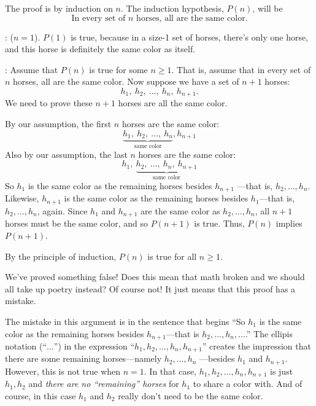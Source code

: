 \begin{bogusproof}

The proof is by induction on $n$.  The induction hypothesis, $P(n)$,
will be
\begin{equation}\label{horsehyp}
\text{In every set of $n$ horses, all are the same color.}
\end{equation}

: ($n=1$).  $P(1)$ is true, because in a
size-1 set of horses, there's only one horse, and this horse is
definitely the same color as itself.

: Assume that $P(n)$ is true for some $n \geq 1$.
That is, assume that in every set of $n$ horses, all are the same color.
Now suppose we have a set of $n+1$ horses:
\[
h_1,\ h_2,\ \dots,\ h_n,\ h_{n+1}.
\]
We need to prove these $n+1$ horses are all the same color.

By our assumption, the first $n$ horses are the same color:
\[
\underbrace{h_1,\ h_2,\ \dots,\ h_n}_{\text{same color}}, h_{n+1}
\]
Also by our assumption, the last $n$ horses are the same color:
\[
h_1,\ \underbrace{h_2,\ \dots,\ h_n,\ h_{n+1}}_{\text{same color}}
\]
So $h_1$ is the same color as the remaining horses besides $h_{n+1}$
---that is, $h_2, \dots, h_n$.  Likewise, $h_{n+1}$ is the same
color as the remaining horses besides $h_1$---that is, $h_2, \dots,
h_n$, again.  Since $h_1$ and $h_{n+1}$ are the same color as $h_2,
\dots, h_n$, all $n+1$ horses must be the same color, and so $P(n+1)$
is true.  Thus, $P(n)$ implies $P(n+1)$.

By the principle of induction, $P(n)$ is true for all $n \geq 1$.
\end{bogusproof}
We've proved something false!  Does this mean that math broken and we
should all take up poetry instead?  Of course not!  It just means
that this proof has a mistake.

\iffalse

\textbf{See if you can figure it out before we take it up in class.}
\fi



The mistake in this argument is in the sentence that begins ``So $h_1$
is the same color as the remaining horses besides $h_{n+1}$---that is
$h_2, \dots, h_n, \dots$.''  The ellipis notation (``$\dots$'') in the
expression ``$h_1, h_2, \dots, h_n, h_{n+1}$'' creates the impression
that there are some remaining horses---namely $h_2, \dots, h_n$
---besides $h_1$ and $h_{n+1}$.  However, this is not true when $n =
1$.  In that case, $h_1, h_2, \dots, h_n, h_{n+1}$ is just $h_1, h_2$
and \emph{there are no ``remaining'' horses} for $h_1$ to share a
color with.  And of course, in this case $h_1$ and $h_2$ really don't
need to be the same color.

